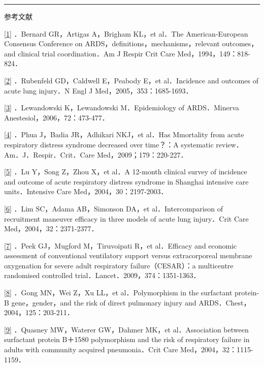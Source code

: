 \begin{center}\rule{0.5\linewidth}{\linethickness}\end{center}

参考文献

\protect\hyperlink{text00011.htmlux5cux23ch1-10-back}{{[}1{]}} ．Bernard
GR，Artigas A，Brigham KL，et al．The American-European Consensus
Conference on ARDS，definitions，mechanisms，relevant outcomes，and
clinical trial coordination．Am J Respir Crit Care
Med，1994，149：818-824．

\protect\hyperlink{text00011.htmlux5cux23ch2-10-back}{{[}2{]}}
．Rubenfeld GD，Caldwell E，Peabody E，et al．Incidence and outcomes of
acute lung injury．N Engl J Med，2005，353：1685-1693．

\protect\hyperlink{text00011.htmlux5cux23ch3-10-back}{{[}3{]}}
．Lewandowski K，Lewandowski M．Epidemiology of ARDS．Minerva
Anestesiol，2006，72：473-477．

\protect\hyperlink{text00011.htmlux5cux23ch4-10-back}{{[}4{]}} ．Phua
J，Badia JR，Adhikari NKJ，et al．Has Mmortality from acute respiratory
distress syndrome decreased over time？：A systematic
review．Am．J．Respir．Crit．Care Med，2009；179：220-227．

\protect\hyperlink{text00011.htmlux5cux23ch5-10-back}{{[}5{]}} ．Lu
Y，Song Z，Zhou X，et al．A 12-month clinical survey of incidence and
outcome of acute respiratory distress syndrome in Shanghai intensive
care units．Intensive Care Med，2004，30：2197-2003．

\protect\hyperlink{text00011.htmlux5cux23ch6-10-back}{{[}6{]}} ．Lim
SC，Adama AB，Simonson DA，et al．Intercomparison of recruitment
maneuver efficacy in three models of acute lung injury．Crit Care
Med，2004，32：2371-2377．

\protect\hyperlink{text00011.htmlux5cux23ch7-10-back}{{[}7{]}} ．Peek
GJ，Mugford M，Tiruvoipati R，et al．Efficacy and economic assessment of
conventional ventilatory support versus extracorporeal membrane
oxygenation for severe adult respiratory failure（CESAR）：a multicentre
randomised controlled trial．Lancet．2009，374：1351-1363．

\protect\hyperlink{text00011.htmlux5cux23ch8-10-back}{{[}8{]}} ．Gong
MN，Wei Z，Xu LL，et al．Polymorphism in the surfactant protein-B
gene，gender，and the risk of direct pulmonary injury and
ARDS．Chest，2004，125：203-211．

\protect\hyperlink{text00011.htmlux5cux23ch9-10-back}{{[}9{]}} ．Quasney
MW，Waterer GW，Dahmer MK，et al．Association between surfactant protein
B＋1580 polymorphism and the risk of respiratory failure in adults with
community acquired pneumonia．Crit Care Med，2004，32：1115-1159．

